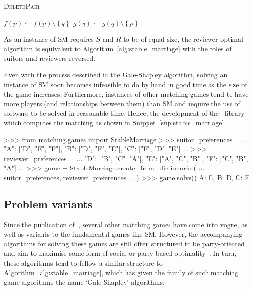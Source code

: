 \balg%
\caption{\textsc{DeletePair}}\label{alg:delete}
\vspace{1em}

\(f(p) \gets f(p) \setminus \left\{q\right\}\)\;
\(g(q) \gets g(q) \setminus \left\{p\right\}\)\;
\ealg%

As an instance of SM requires \(S\) and \(R\) to be of equal size, the
reviewer-optimal algorithm is equivalent to Algorithm~\ref{alg:stable_marriage}
with the roles of suitors and reviewers reversed.

Even with the process described in the Gale-Shapley algorithm, solving an
instance of SM soon becomes infeasible to do by hand in good time as the size of
the game increases. Furthermore, instances of other matching games tend to have
more players (and relationships between them) than SM and require the use of
software to be solved in reasonable time. Hence, the development of the
\matching\ library which computes the matching as shown in
Snippet~\ref{snp:stable_marriage}.

\begin{listing}[htbp]
\begin{usagepy}
>>> from matching.games import StableMarriage
>>> suitor_preferences = {
...     "A": ["D", "E", "F"], "B": ["D", "F", "E"], "C": ["F", "D", "E"]
... }
>>> reviewer_preferences = {
...     "D": ["B", "C", "A"], "E": ["A", "C", "B"], "F": ["C", "B", "A"]
... }
>>> game = StableMarriage.create_from_dictionaries(
...     suitor_preferences, reviewer_preferences
... )
>>> game.solve()
{A: E, B: D, C: F}

\end{usagepy}
\caption{%
    Solving the game from Figure~\ref{fig:sm_matching} in \matching
}\label{snp:stable_marriage}
\end{listing}

\subsection{Problem variants}

Since the publication of~\cite{Gale1962}, several other matching games have come
into vogue, as well as variants to the fundamental games like SM. However, the
accompanying algorithms for solving these games are still often structured to be
party-oriented and aim to maximise some form of social or party-based
optimality~\cite{Fuku2006,Gale1962,Kwanashie2015}. In turn, these algorithms
tend to follow a similar structure to Algorithm~\ref{alg:stable_marriage}, which
has given the family of such matching game algorithms the name `Gale-Shapley'
algorithms.


